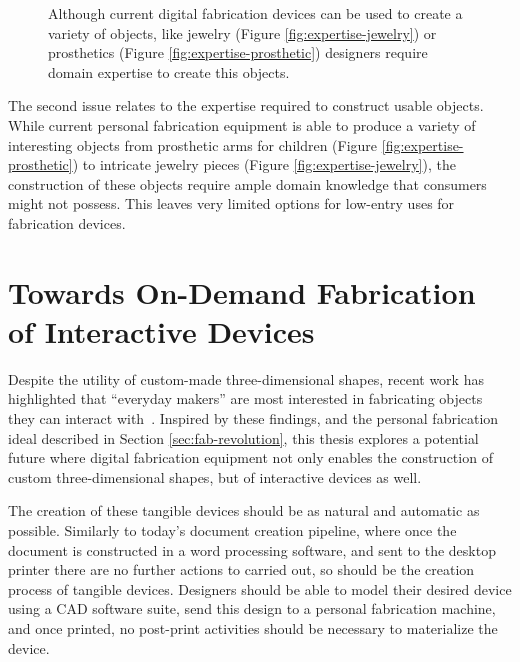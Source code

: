     \begin{figure}[h]
      \centering
      \label{}

      \caption{Although current digital fabrication devices can be used to
        create a variety of objects, like jewelry (Figure
        \ref{fig:expertise-jewelry}) or prosthetics (Figure
        \ref{fig:expertise-prosthetic}) designers require domain expertise to
        create this objects.}
    \end{figure}

    \newpage
    The second issue relates to the expertise required to construct usable
    objects. While current personal fabrication equipment is able to produce a
    variety of interesting objects from prosthetic arms for children (Figure
    \ref{fig:expertise-prosthetic}) to intricate jewelry pieces (Figure
    \ref{fig:expertise-jewelry}), the construction of these objects require
    ample domain knowledge that consumers might not possess.  This leaves very
    limited options for low-entry uses for fabrication devices.

  \section{Towards On-Demand Fabrication of Interactive Devices} \label{sec:on-demand}
    Despite the utility of custom-made three-dimensional shapes, recent work has
    highlighted that ``everyday makers'' are most interested in fabricating
    objects they can interact with~\cite{Shewbridge:2014}. Inspired by these
    findings, and the personal fabrication ideal described in Section
    \ref{sec:fab-revolution}, this thesis explores a potential future where
    digital fabrication equipment not only enables the construction of custom
    three-dimensional shapes, but of interactive devices as well.

    The creation of these tangible devices should be as natural and automatic as
    possible. Similarly to today's document creation pipeline, where once the
    document is constructed in a word processing software, and sent to the
    desktop printer there are no further actions to carried out, so should be
    the creation process of tangible devices. Designers should be able to model
    their desired device using a CAD software suite, send this design to a
    personal fabrication machine, and once printed, no post-print activities
    should be necessary to materialize the device.

